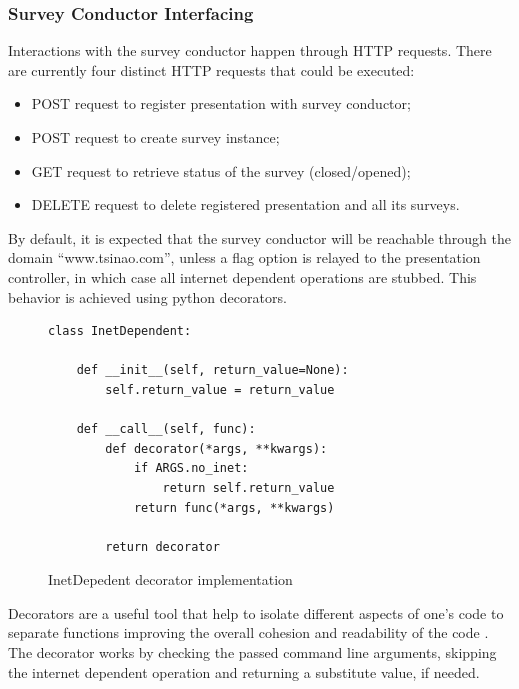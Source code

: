 \documentclass[12pt, fleqn, a4paper]{article}
\begin{document}
\subsubsection{Survey Conductor Interfacing}
Interactions with the survey conductor happen through HTTP requests. There are currently four distinct HTTP requests that could be executed:
\begin{itemize}
	\item POST request to register presentation with survey conductor;
	\item POST request to create survey instance;
	\item GET request to retrieve status of the survey (closed/opened);
	\item DELETE request to delete registered presentation and all its surveys.
\end{itemize}
By default, it is expected that the survey conductor will be reachable through the domain \enquote{www.tsinao.com}, unless a flag option is relayed to the presentation controller, in which case all internet dependent operations are stubbed. This behavior is achieved using python decorators.
\begin{figure}[H]
	\centering
	\begin{verbatim} 
class InetDependent:

    def __init__(self, return_value=None):
        self.return_value = return_value

    def __call__(self, func):
        def decorator(*args, **kwargs):
            if ARGS.no_inet:
                return self.return_value
            return func(*args, **kwargs)

        return decorator
	\end{verbatim}
	\caption{InetDepedent decorator implementation}
\end{figure}
Decorators are a useful tool that help to isolate different aspects of one's code to separate functions improving the overall cohesion and readability of the code \citep{anaya_2021}. 
The  decorator works by checking the passed command line arguments, skipping the internet dependent operation and returning a substitute value, if needed.
\end{document}
